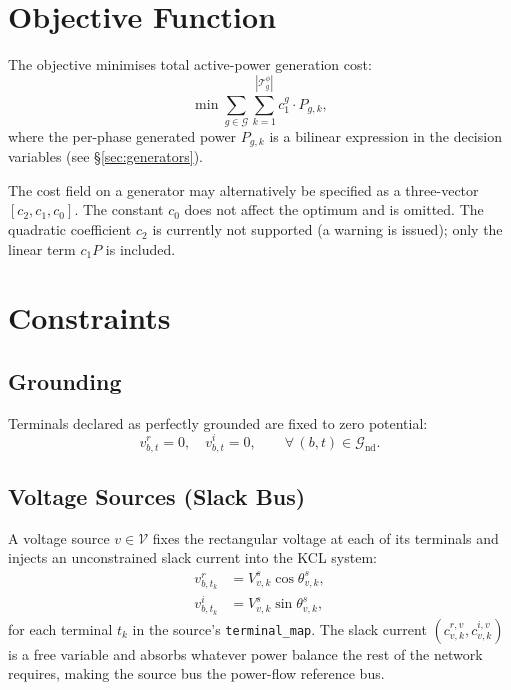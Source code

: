 \documentclass[11pt,a4paper]{article}
\newcommand{\mc}[1]{\mathcal{#1}}
\newcommand{\vr}[2]{v^r_{#1,#2}}
\newcommand{\vi}[2]{v^i_{#1,#2}}
\begin{document}
\section{Objective Function}

The objective minimises total active-power generation cost:
%
\begin{equation}
  \min \sum_{g\in\mc{G}} \sum_{k=1}^{|\mc{T}_g^\phi|}
    c^g_1 \cdot P_{g,k},
\end{equation}
%
where the per-phase generated power $P_{g,k}$ is a bilinear expression in
the decision variables (see \S\ref{sec:generators}).

The cost field on a generator may alternatively be specified as a three-vector
$[c_2, c_1, c_0]$.  The constant $c_0$ does not affect the optimum and is
omitted.  The quadratic coefficient $c_2$ is currently not supported (a warning
is issued); only the linear term $c_1 P$ is included.

\section{Constraints}

\subsection{Grounding}

Terminals declared as perfectly grounded are fixed to zero potential:
%
\begin{equation}
  \vr{b}{t} = 0,\quad \vi{b}{t} = 0, \qquad \forall\,(b,t)\in\mc{G}_\text{nd}.
\end{equation}

\subsection{Voltage Sources (Slack Bus)}

A voltage source $v\in\mc{V}$ fixes the rectangular voltage at each of its
terminals and injects an unconstrained slack current into the KCL system:
%
\begin{align}
  \vr{b}{t_k} &= V^s_{v,k}\cos\theta^s_{v,k}, \\
  \vi{b}{t_k} &= V^s_{v,k}\sin\theta^s_{v,k},
\end{align}
%
for each terminal $t_k$ in the source's \texttt{terminal\_map}.  The slack
current $(c^{r,v}_{v,k}, c^{i,v}_{v,k})$ is a free variable and absorbs
whatever power balance the rest of the network requires, making the source bus
the power-flow reference bus.
\end{document}
